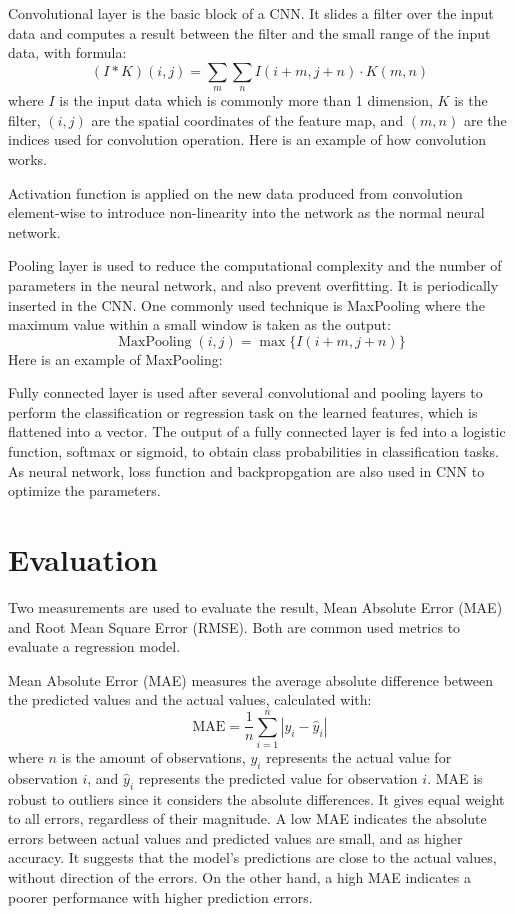 \documentclass[12pt,a4paper,english
]{tunithesis}
\begin{document}
Convolutional layer is the basic block of a CNN. It slides a filter over the input data and computes a result between the filter and the small range of the input data, with formula:
\begin{equation*}
    (I * K)(i, j)=\sum_m \sum_n I(i+m, j+n) \cdot K(m, n)
\end{equation*}
where $I$ is the input data which is commonly more than 1 dimension, $K$ is the filter, $(i, j)$ are the spatial coordinates of the feature map, and $(m, n)$ are the indices used for convolution operation. Here is an example of how convolution works.

Activation function is applied on the new data produced from convolution element-wise to introduce non-linearity into the network as the normal neural network.

Pooling layer is used to reduce the computational complexity and the number of parameters in the neural network, and also prevent overfitting. It is periodically inserted in the CNN. One commonly used technique is MaxPooling where the maximum value within a small window is taken as the output:
\begin{equation*}
    \operatorname{MaxPooling}(i, j)=\max \{I(i+m, j+n)\}
\end{equation*}
Here is an example of MaxPooling:

Fully connected layer is used after several convolutional and pooling layers to perform the classification or regression task on the learned features, which is flattened into a vector. The output of a fully connected layer is fed into a logistic function, softmax or sigmoid, to obtain class probabilities in classification tasks. As neural network, loss function and backpropgation are also used in CNN to optimize the parameters.


\section{Evaluation}
Two measurements are used to evaluate the result, Mean Absolute Error (MAE) and Root Mean Square Error (RMSE). Both are common used metrics to evaluate a regression model.

Mean Absolute Error (MAE) measures the average absolute difference between the predicted values and the actual values, calculated with: 
\begin{equation*}
    \mathrm{MAE}=\frac{1}{n} \sum_{i=1}^n\left|y_i-\hat{y}_i\right|
\end{equation*}
where $n$ is the amount of observations, $y_i$ represents the actual value for observation $i$, and $\hat{y}_i$ represents the predicted value for observation $i$. MAE is robust to outliers since it considers the absolute differences. It gives equal weight to all errors, regardless of their magnitude. A low MAE indicates the absolute errors between actual values and predicted values are small, and as higher accuracy. It suggests that the model's predictions are close to the actual values, without direction of the errors. On the other hand, a high MAE indicates a poorer performance with higher prediction errors.
\end{document}
